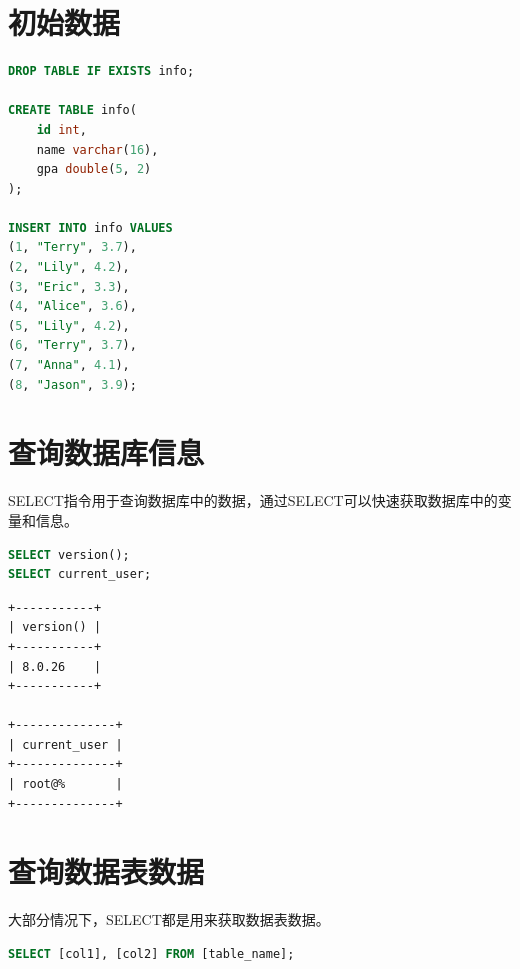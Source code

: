 \documentclass[12pt, openany, oneside]{book}
\begin{document}
\section{初始数据}


\begin{lstlisting}[language=SQL]
DROP TABLE IF EXISTS info;

CREATE TABLE info(
    id int,
    name varchar(16),
    gpa double(5, 2)
);

INSERT INTO info VALUES
(1, "Terry", 3.7),
(2, "Lily", 4.2),
(3, "Eric", 3.3),
(4, "Alice", 3.6),
(5, "Lily", 4.2),
(6, "Terry", 3.7),
(7, "Anna", 4.1),
(8, "Jason", 3.9);
\end{lstlisting}

\vspace{0.5cm}

\section{查询数据库信息}

SELECT指令用于查询数据库中的数据，通过SELECT可以快速获取数据库中的变量和信息。\\


\begin{lstlisting}[language=SQL]
SELECT version();
SELECT current_user;
\end{lstlisting}

\begin{tcolorbox}
\begin{verbatim}
+-----------+
| version() |
+-----------+
| 8.0.26    |
+-----------+

+--------------+
| current_user |
+--------------+
| root@%       |
+--------------+
\end{verbatim}
\end{tcolorbox}

\vspace{0.5cm}

\section{查询数据表数据}

大部分情况下，SELECT都是用来获取数据表数据。

\vspace{-0.5cm}

\begin{lstlisting}[language=SQL]
SELECT [col1], [col2] FROM [table_name];
\end{lstlisting}
\end{document}
